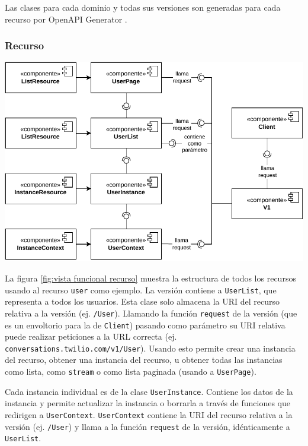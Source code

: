 \documentclass{article}
\begin{document}
Las clases para cada dominio y todas sus versiones
son generadas para cada recurso por OpenAPI Generator
\cite{twilio-generated-openapi}.

\newpage

\subsubsection{Recurso}

\hfill

\begin{center}
  \includegraphics[width=\textwidth]{VistaFuncionalRecurso.pdf}
  \label{fig:vista funcional recurso}
\end{center}

\hfill

La figura \ref{fig:vista funcional recurso}
muestra la estructura de todos los recursos
usando al recurso \verb|user| como ejemplo.
La versión contiene a \verb|UserList|,
que representa a todos los usuarios.
Esta clase solo almacena la URI del recurso relativa a la versión
(ej. \verb|/User|).
Llamando la función \verb|request| de la versión
(que es un envoltorio para la de \verb|Client|)
pasando como parámetro su URI relativa
puede realizar peticiones a la URL correcta
(ej. \verb|conversations.twilio.com/v1/User|).
Usando esto permite crear una instancia del recurso,
obtener una instancia del recurso,
u obtener todas las instancias
como lista, como \verb|stream| o como lista paginada
(usando a \verb|UserPage|).

Cada instancia individual es de la clase \verb|UserInstance|.
Contiene los datos de la instancia
y permite actualizar la instancia o borrarla
a través de funciones que redirigen a \verb|UserContext|.
\verb|UserContext| contiene la URI del recurso relativa a la versión
(ej. \verb|/User|)
y llama a la función \verb|request| de la versión,
idénticamente a \verb|UserList|.
\end{document}
